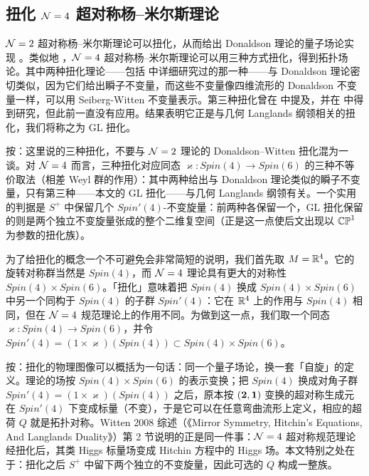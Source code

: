 
\subsection{扭化 ${\EUN}=4$ 超对称杨--米尔斯理论}

\label{sec:twisting}

\par{}


${\EUN}=2$ 超对称杨--米尔斯理论可以扭化，从而给出 Donaldson 理论的量子场论实现 \cite{ref25}。类似地 \cite{ref45}，${\EUN}=4$ 超对称杨--米尔斯理论可以用三种方式扭化，得到拓扑场论。其中两种扭化理论——包括 \cite{ref45} 中详细研究过的那一种——与 Donaldson 理论密切类似，因为它们给出瞬子不变量，而这些不变量像四维流形的 Donaldson 不变量一样，可以用 Seiberg-Witten 不变量表示。第三种扭化曾在 \cite{ref52} 中提及，并在 \cite{ref53,ref54,ref55,ref56,ref57} 中得到研究，但此前一直没有应用。结果表明它正是与几何 Langlands 纲领相关的扭化，我们将称之为 GL 扭化。

\begin{yizhu}[易错点]
按：这里说的三种扭化，不要与 ${\EUN}=2$ 理论的 Donaldson--Witten 扭化混为一谈。对 ${\EUN}=4$ 而言，三种扭化对应同态 $\varkappa:Spin(4)\to Spin(6)$ 的三种不等价取法（相差 Weyl 群的作用）：其中两种给出与 Donaldson 理论类似的瞬子不变量，只有第三种——本文的 GL 扭化——与几何 Langlands 纲领有关。一个实用的判据是 $S^+$ 中保留几个 $Spin'(4)$-不变旋量：前两种各保留一个，GL 扭化保留的则是两个独立不变旋量张成的整个二维复空间（正是这一点使后文出现以 $\Bbb{CP}^1$ 为参数的扭化族）。
\end{yizhu}

为了给扭化的概念一个不可避免会非常简短的说明，我们首先取 $M=\Bbb{R}^4$。它的旋转对称群当然是 $Spin(4)$，而 ${\EUN}=4$ 理论具有更大的对称性 $Spin(4)\times Spin(6)$。「扭化」意味着把 $Spin(4)$ 换成 $Spin(4)\times Spin(6)$ 中另一个同构于 $Spin(4)$ 的子群 $Spin'(4)$：它在 $\Bbb{R}^4$ 上的作用与 $Spin(4)$ 相同，但在 ${\EUN}=4$ 规范理论上的作用不同。为做到这一点，我们取一个同态 $\varkappa:Spin(4)\to Spin(6)$，并令 $Spin'(4)=(1\times \varkappa)(Spin(4))\subset Spin(4)\times Spin(6)$。

\begin{yizhu}[物理图像]
按：扭化的物理图像可以概括为一句话：同一个量子场论，换一套「自旋」的定义。理论的场按 $Spin(4)\times Spin(6)$ 的表示变换；把 $Spin(4)$ 换成对角子群 $Spin'(4)=(1\times\varkappa)(Spin(4))$ 之后，原本按 $({\bf 2},\bone)$ 变换的超对称生成元在 $Spin'(4)$ 下变成标量（不变），于是它可以在任意弯曲流形上定义，相应的超荷 $Q$ 就是拓扑对称。Witten 2008 综述（《Mirror Symmetry, Hitchin's Equations, And Langlands Duality》）第 2 节说明的正是同一件事：${\EUN}=4$ 超对称规范理论经扭化后，其类 Higgs 标量场变成 Hitchin 方程中的 Higgs 场。本文特别之处在于：扭化之后 $S^+$ 中留下两个独立的不变旋量，因此可选的 $Q$ 构成一整族。
\end{yizhu}

